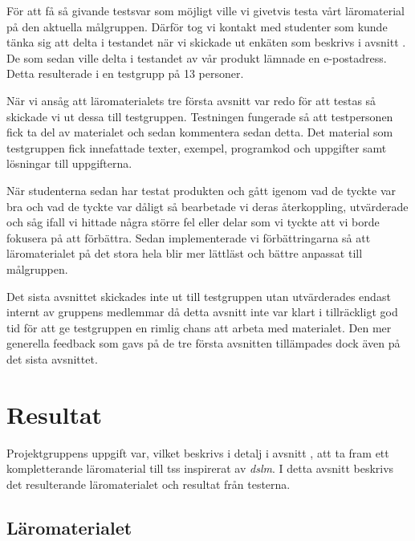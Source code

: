 \documentclass[12pt,a4paper,twoside,openright]{article}
\begin{document}
För att få så givande testsvar som möjligt ville vi givetvis testa
vårt läromaterial på den aktuella målgruppen. Därför tog vi kontakt
med studenter som kunde tänka sig att delta i testandet när vi
skickade ut enkäten som beskrivs i avsnitt
. De som sedan ville delta i testandet
av vår produkt lämnade en e-postadress. Detta resulterade i en
testgrupp på 13 personer.

När vi ansåg att läromaterialets tre första avsnitt var redo för att
testas så skickade vi ut dessa till testgruppen. Testningen fungerade
så att testpersonen fick ta del av materialet och sedan kommentera
sedan detta.  Det material som testgruppen fick innefattade texter,
exempel, programkod och uppgifter samt lösningar till uppgifterna.

När studenterna sedan har testat produkten och gått igenom vad de
tyckte var bra och vad de tyckte var dåligt så bearbetade vi deras
återkoppling, utvärderade och såg ifall vi hittade några större fel
eller delar som vi tyckte att vi borde fokusera på att
förbättra. Sedan implementerade vi förbättringarna så att
läromaterialet på det stora hela blir mer lättläst och bättre anpassat
till målgruppen.

Det sista avsnittet skickades inte ut till testgruppen utan
utvärderades endast internt av gruppens medlemmar då detta avsnitt
inte var klart i tillräckligt god tid för att ge testgruppen en rimlig
chans att arbeta med materialet. Den mer generella feedback som gavs
på de tre första avsnitten tillämpades dock även på det sista
avsnittet.

\newpage

\section{Resultat}


%
Projektgruppens uppgift var, vilket beskrivs i detalj i avsnitt
, att ta fram ett kompletterande läromaterial
till \gls{tss} inspirerat av \textit{\gls{dslm}}. I detta avsnitt
beskrivs det resulterande läromaterialet och resultat från testerna.

\subsection{Läromaterialet}
\end{document}
